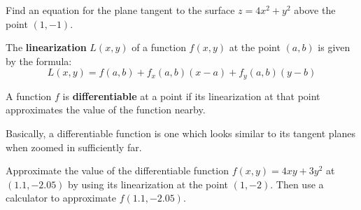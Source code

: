 \documentclass[letterpaper, twoside, 12pt]{book}
\begin{document}
          \begin{solution}

          \end{solution}

          \begin{problem}
            Find an equation for the plane tangent to the surface
            $z=4x^2+y^2$ above the point $(1,-1)$.
          \end{problem}

          \begin{solution}

          \end{solution}

\begin{definition}
  The \textbf{linearization} $L(x,y)$ of a function $f(x,y)$
  at the point $(a,b)$ is given by the formula:
  \[
    L(x,y) = f(a,b)+f_x(a,b)(x-a)+f_y(a,b)(y-b)
  \]
\end{definition}

\begin{definition}
  A function $f$ is \textbf{differentiable} at a point if its linearization
  at that point approximates the value of the function nearby.
\end{definition}

\begin{remark}
  Basically, a differentiable function is one which looks similar to
  its tangent planes when zoomed in sufficiently far.
\end{remark}

          \begin{problem}
            Approximate the value of the differentiable function
            $f(x,y)=4xy+3y^2$ at $(1.1,-2.05)$ by using its linearization
            at the point $(1,-2)$.
            Then use a calculator to approximate $f(1.1,-2.05)$.
          \end{problem}

          \begin{solution}

          \end{solution}
\end{document}

